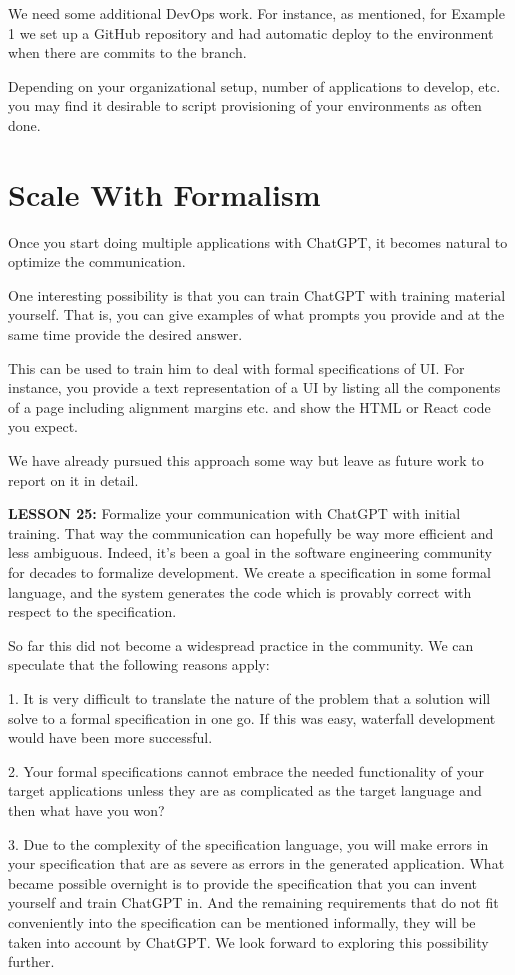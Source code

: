 \documentclass[runningheads]{llncs}
\begin{document}
We need some additional DevOps work. For instance, as mentioned, for Example 1 we set up a GitHub repository and had automatic deploy to the environment when there are commits to the branch.

Depending on your organizational setup, number of applications to develop, etc. you may find it desirable to script provisioning of your environments as often done.

\section{Scale With Formalism}

Once you start doing multiple applications with ChatGPT, it becomes natural to optimize the communication.

One interesting possibility is that you can train ChatGPT with training material yourself. That is, you can give examples of what prompts you provide and at the same time provide the desired answer.

This can be used to train him to deal with formal specifications of UI. For instance, you provide a text representation of a UI by listing all the components of a page including alignment margins etc. and show the HTML or React code you expect.

We have already pursued this approach some way but leave as future work to report on it in detail.

\textbf{LESSON 25:} Formalize your communication with ChatGPT with initial training. That way the communication can hopefully be way more efficient and less ambiguous.
Indeed, it's been a goal in the software engineering community for decades to formalize development. We create a specification in some formal language, and the system generates the code which is provably correct with respect to the specification.

So far this did not become a widespread practice in the community. We can speculate that the following reasons apply:

1. It is very difficult to translate the nature of the problem that a solution will solve to a formal specification in one go. If this was easy, waterfall development would have been more successful.

2. Your formal specifications cannot embrace the needed functionality of your target applications unless they are as complicated as the target language and then what have you won?

3. Due to the complexity of the specification language, you will make errors in your specification that are as severe as errors in the generated application.
What became possible overnight is to provide the specification that you can invent yourself and train ChatGPT in. And the remaining requirements that do not fit conveniently into the specification can be mentioned informally, they will be taken into account by ChatGPT. We look forward to exploring this possibility further.
  
\end{document}
